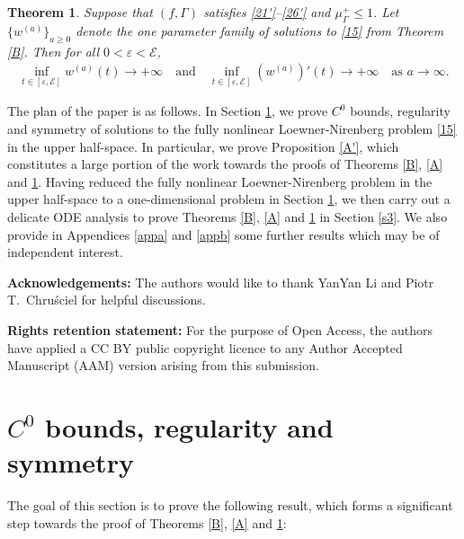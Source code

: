 \documentclass[12pt]{article}
\numberwithin{equation}{section}
\theoremstyle{plain}
\newtheorem{thm}{Theorem}[section]
\theoremstyle{definition}
\newcommand{\ep}{\varepsilon}
\begin{document}
\begin{thm}\label{D}
	Suppose that $(f,\Gamma)$ satisfies \eqref{21'}--\eqref{26'} and $\mu_\Gamma^+ \leq 1$. Let $\{w^{(a)}\}_{a\geq 0}$ denote the one parameter family of solutions to \eqref{15} from Theorem \ref{B}. Then for all $0<\ep<\mathcal{E}$,
	\begin{align*}
	\inf_{t\in[\ep,\mathcal{E}]} w^{(a)}(t) \rightarrow+\infty \quad \text{and} \quad \inf_{t\in[\ep,\mathcal{E}]} (w^{(a)})'(t) \rightarrow+\infty \quad \text{as }a\rightarrow\infty.
	\end{align*}
\end{thm}



	
	The plan of the paper is as follows. In Section \ref{s2}, we prove $C^0$ bounds, regularity and symmetry of solutions to the fully nonlinear Loewner-Nirenberg problem \eqref{15} in the upper half-space. In particular, we prove Proposition \ref{A'}, which constitutes a large portion of the work towards the proofs of Theorems \ref{B}, \ref{A} and \ref{D}. Having reduced the fully nonlinear Loewner-Nirenberg problem in the upper half-space to a one-dimensional problem in Section \ref{s2}, we then carry out a delicate ODE analysis to prove Theorems \ref{B}, \ref{A} and \ref{D} in Section \ref{s3}. We also provide in Appendices \ref{appa} and \ref{appb} some further results which may be of independent interest.\medskip 
	
	\noindent\textbf{Acknowledgements:} The authors would like to thank YanYan Li and Piotr T.~Chru\'sciel for helpful discussions. \medskip 
	
	\noindent\textbf{Rights retention statement:} For the purpose of Open Access, the authors have applied a CC BY public copyright licence to any Author Accepted Manuscript (AAM) version arising from this submission.
	
	


\section{$C^0$ bounds, regularity and symmetry}\label{s2}

The goal of this section is to prove the following result, which forms a significant step towards the proof of Theorems \ref{B}, \ref{A} and \ref{D}:
\end{document}
